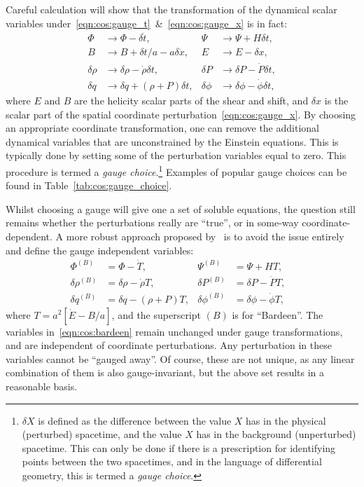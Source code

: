 Careful calculation will show that the transformation of the dynamical scalar variables under~\eqref{eqn:cos:gauge_t}~\&~\eqref{eqn:cos:gauge_x} is in fact:
\begin{align}
  \Phi &\rightarrow \Phi - \delta \dot{t}, &
  \Psi &\rightarrow \Psi +H \delta t,  \nonumber\\
  B &\rightarrow B + \delta t/a - a\delta \dot{x}, &
  E &\rightarrow E - \delta x, \nonumber\\
  \delta\rho &\rightarrow \delta\rho - \dot{\rho}\delta t, &
  \delta P &\rightarrow \delta P - \dot{P}\delta t, \nonumber\\
  \delta q &\rightarrow \delta q + (\rho+P)\delta t,&
  \delta \phi &\rightarrow \delta \phi - \dot{\phi}\delta t,
\end{align}
where \(E\) and \(B\) are the helicity scalar parts of the shear and shift, and \(\delta x\) is the scalar part of the spatial coordinate perturbation~\eqref{eqn:cos:gauge_x}.
By choosing an appropriate coordinate transformation, one can remove the additional dynamical variables that are unconstrained by the Einstein equations. This is typically done by setting some of the perturbation variables equal to zero. This procedure is termed a {\em gauge choice}.\footnote{\(\delta X\) is defined as the difference between the value \(X\) has in the physical (perturbed) spacetime, and the value \(X\) has in the background (unperturbed) spacetime. This can only be done if there is a prescription for identifying points between the two spacetimes, and in the language of differential geometry, this is termed a {\em gauge choice}.}
Examples of popular gauge choices can be found in Table~\ref{tab:cos:gauge_choice}.

Whilst choosing a gauge will give one a set of soluble equations, the question still remains whether the perturbations really are ``true'', or in some-way coordinate-dependent. A more robust approach proposed by~\cite{Bardeen_GI} is to avoid the issue entirely and define the gauge independent variables:
\begin{align}
  \Phi^{(B)} &=  \Phi - \dot{T}, &
  \Psi^{(B)} &=  \Psi + HT, \nonumber \\
  \delta\rho^{(B)} &= \delta\rho - \dot{\rho}T, &
  \delta P^{(B)} &= \delta P - \dot{P}T, & \nonumber\\
  \delta q^{(B)} &= \delta q - (\rho + P)T, &
  \delta \phi^{(B)} &= \delta \phi - \dot{\phi}T, 
  \label{eqn:cos:bardeen}
\end{align}
where \(T = a^2[\dot{E}-B/a]\), and the superscript \((B)\) is for ``Bardeen''. The variables in~\eqref{eqn:cos:bardeen} remain unchanged under gauge transformations, and are independent of coordinate perturbations. Any perturbation in these variables cannot be ``gauged away''. Of course, these are not unique, as any linear combination of them is also gauge-invariant, but the above set results in a reasonable basis. 

